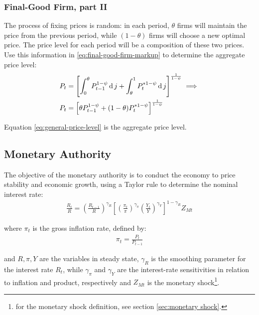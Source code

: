 \documentclass[
thesis.tex
]{subfiles}
\begin{document}
	\subsubsection{Final-Good Firm, part II}
	
	The process of fixing prices is random: in each period, $\theta$ firms will maintain the price from the previous period, while $(1-\theta)$ firms will choose a new optimal price. The price level for each period will be a composition of these two prices. Use this information in \ref{eq:final-good-firm-markup} to determine the aggregate price level:
	\begin{align}
		P_t & = \left[ \int_{0}^{\theta} P_{t-1}^{1-\psi} \operatorname{d} j + \int_{\theta}^{1} P_t^{\ast 1-\psi} \operatorname{d} j \right]^{\frac{1}{1-\psi}}  \implies \nonumber \\
		P_t & = \left[ \theta P_{t-1}^{1-\psi} + (1-\theta) P_t^{\ast 1-\psi} \right]^\frac{1}{1-\psi} \label{eq:general-price-level}
	\end{align}
	
	Equation \ref{eq:general-price-level} is the aggregate price level.
	
	
	\subsection{Monetary Authority}
	
	The objective of the monetary authority is to conduct the economy to price stability and economic growth, using a Taylor rule \cite{taylor_discretion_1993} to determine the nominal interest rate:
	\begin{align}
		\label{eq:monetary-policy}
		\frac{R_t}{R} =
		\left( \frac{R_{t-1}}{R} \right)^{\gamma_R}  \left[
		\left( \frac{\pi_t}{\pi} \right)^{\gamma_\pi}
		\left( \frac{Y_t}{Y} \right)^{\gamma_Y} \right]^{1-\gamma_R} Z_{Mt}
	\end{align}
	
	where $\pi_t$ is the gross inflation rate, defined by:
	\begin{align}
		\pi_t = \frac{P_t}{P_{t-1}}
		\label{eq:gross-inflation-rate}
	\end{align}
	
	and $R, \pi, Y$ are the variables in steady state, $\gamma_R$ is the smoothing parameter for the interest rate $R_t$, while $\gamma_\pi$ and $\gamma_Y$ are the interest-rate sensitivities in relation to inflation and product, respectively and $Z_{Mt}$ is the monetary shock\footnote{for the monetary shock definition, see section \ref{sec:monetary shock}.}.
	
\end{document}
